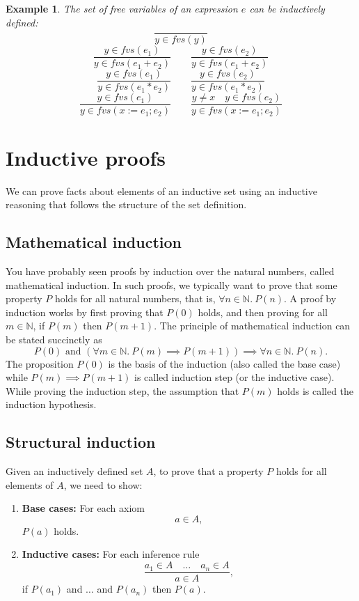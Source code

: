\documentclass[11pt]{article}
\newtheorem{example}{Example}
\begin{document}
\begin{example}
The set of free variables of an expression $e$ can be inductively defined:
\[
\frac{}{y \in fvs(y)}
\]
\[
\frac{y \in fvs(e_1)}{y \in fvs(e_1 + e_2)} \qquad
\frac{y \in fvs(e_2)}{y \in fvs(e_1 + e_2)}
\]
\[
\frac{y \in fvs(e_1)}{y \in fvs(e_1 * e_2)} \qquad
\frac{y \in fvs(e_2)}{y \in fvs(e_1 * e_2)}
\]
\[
\frac{y \in fvs(e_1)}{y \in fvs(x := e_1 ; e_2)} \qquad
\frac{y \neq x \quad y \in fvs(e_2)}{y \in fvs(x := e_1 ; e_2)}
\]
\end{example}

\section{Inductive proofs}

We can prove facts about elements of an inductive set using an inductive reasoning that follows
the structure of the set definition.

\subsection{Mathematical induction}

You have probably seen proofs by induction over the natural numbers, called mathematical
induction. In such proofs, we typically want to prove that some property $P$ holds for all
natural numbers, that is, $\forall n \in \mathbb{N}.\ P(n)$. A proof by induction works by first
proving that $P(0)$ holds, and then proving for all $m \in \mathbb{N}$, if $P(m)$ then $P(m +
1)$. The principle of mathematical induction can be stated succinctly as
\[
P(0) \text{ and } (\forall m \in \mathbb{N}.\ P(m) \implies P(m+1)) \implies \forall n \in
\mathbb{N}.\ P(n).
\]
The proposition $P(0)$ is the basis of the induction (also called the base case) while $P(m)
\implies P(m+1)$ is called induction step (or the inductive case). While proving the induction
step, the assumption that $P(m)$ holds is called the induction hypothesis.

\subsection{Structural induction}

Given an inductively defined set $A$, to prove that a property $P$ holds for all elements of
$A$, we need to show:

\begin{enumerate}
    \item \textbf{Base cases:} For each axiom
    \[
    a \in A,
    \]
    $P(a)$ holds.

    \item \textbf{Inductive cases:} For each inference rule
    \[
    \frac{a_1 \in A \quad \ldots \quad a_n \in A}{a \in A},
    \]
    if $P(a_1)$ and $\ldots$ and $P(a_n)$ then $P(a)$.
\end{enumerate}
\end{document}
